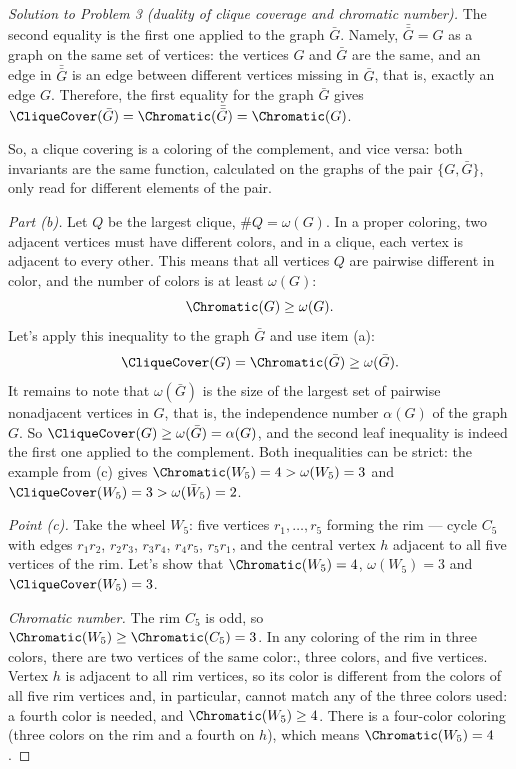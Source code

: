 \documentclass[a4paper,12pt]{report}
\begin{document}
\begin{proof}[Solution to Problem \textup{3} \textup{(}duality of clique coverage and chromatic number\textup{)}]
The second equality is the first one applied to the graph $\bar G$. Namely, $\bar{\bar G}=G$ as a graph on the same set of vertices\textup{:} the vertices $G$ and $\bar G$ are the same, and an edge in $\bar{\bar G}$ is an edge between different vertices missing in $\bar G$, that is, exactly an edge $G$. Therefore, the first equality for the graph $\bar G$ gives $\CliqueCover(\bar G)=\Chromatic(\bar{\bar G})=\Chromatic(G)$.

So, a clique covering is a coloring of the complement, and vice versa\textup{:} both invariants are the same function, calculated on the graphs of the pair $\{G,\bar G\}$, only read for different elements of the pair.

\textit{Part \textup{(b)}.} Let $Q$ be the largest clique, $\#Q=\omega(G)$. In a proper coloring, two adjacent vertices must have different colors, and in a clique, each vertex is adjacent to every other. This means that all vertices $Q$ are pairwise different in color, and the number of colors is at least $\omega(G)$\textup{:}
\[
\Chromatic(G)\ge\omega(G).
\]
Let's apply this inequality to the graph $\bar G$ and use item \textup{(a)}\textup{:}
\[
\CliqueCover(G)=\Chromatic(\bar G)\ge\omega(\bar G).
\]
It remains to note that $\omega(\bar G)$ is the size of the largest set of pairwise nonadjacent vertices in $G$, that is, the independence number $\alpha(G)$ of the graph $G$. So $\CliqueCover(G)\ge\omega(\bar G)=\alpha(G)$, and the second leaf inequality is indeed the first one applied to the complement. Both inequalities can be strict: the example from \textup{(c)} gives $\Chromatic(W_5)=4>\omega(W_5)=3$ and $\CliqueCover(W_5)=3>\omega(\bar W_5)=2$.

\textit{Point \textup{(c)}.} Take the wheel $W_5$: five vertices $r_1,\dots,r_5$ forming the rim --- cycle $C_5$ with edges $r_1r_2$, $r_2r_3$, $r_3r_4$, $r_4r_5$, $r_5r_1$, and the central vertex $h$ adjacent to all five vertices of the rim. Let's show that $\Chromatic(W_5)=4$, $\omega(W_5)=3$ and $\CliqueCover(W_5)=3$.

\textit{Chromatic number.} The rim $C_5$ is odd, so $\Chromatic(W_5)\ge\Chromatic(C_5)=3$. In any coloring of the rim in three colors, there are two vertices of the same color\textup{:}, three colors, and five vertices. Vertex $h$ is adjacent to all rim vertices, so its color is different from the colors of all five rim vertices and, in particular, cannot match any of the three colors used\textup{:} a fourth color is needed, and $\Chromatic(W_5)\ge4$. There is a four-color coloring (three colors on the rim and a fourth on $h$), which means $\Chromatic(W_5)=4$.


\end{proof}
\end{document}
